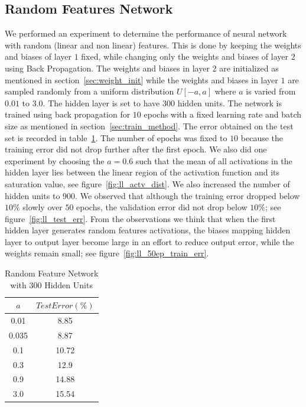 \documentclass[Proceedings]{ascelike}
\begin{document}
\subsection{Random Features Network} We performed an experiment to determine
the performance of neural network with random (linear and non linear) features.
This is done by keeping the weights and biases of layer $1$ fixed, while
changing only the weights and biases of layer $2$ using Back Propagation. The
weights and biases in layer $2$ are initialized as mentioned in
section~\ref{sec:weight_init} while the weights and biases in layer $1$ are sampled
randomly from a uniform distribution $U[-a, a]$ where $a$ is varied from $0.01$
to $3.0$. The hidden layer is set to have $300$ hidden units. The network is
trained using back propagation for $10$ epochs with a fixed learning rate and
batch size as mentioned in section~\ref{sec:train_method}. The error obtained
on the test set is recorded in table~\ref{tab:terror}. The number of epochs was
fixed to $10$ because the training error did not drop further after the first
epoch. We also did one experiment by choosing the $a=0.6$ such that the mean of
all activations in the hidden layer lies between the linear region of the
activation function and its saturation value, see
figure~\ref{fig:ll_actv_dist}. We also increased the number of hidden units to
$900$. We observed that although the training error dropped below $10\%$ slowly
over $50$ epochs, the validation error did not drop below $10\%$; see
figure~\ref{fig:ll_test_err}. From the observations we think that when the
first hidden layer generates random features activations, the biases mapping
hidden layer to output layer become large in an effort to reduce output error,
while the weights remain small; see figure~\ref{fig:ll_50ep_train_err}.

\begin{table}[H] \centering \begin{tabular}{|c||c|} \hline $a$&$Test Error (\%)$\\
\hline \hline 0.01&8.85\\ 0.035&8.87\\ 0.1&10.72\\ 0.3&12.9\\
0.9&14.88\\ 3.0&15.54\\ \hline \end{tabular} \caption{Random Feature Network
with 300 Hidden Units} \label{tab:terror} \end{table}
\end{document}
